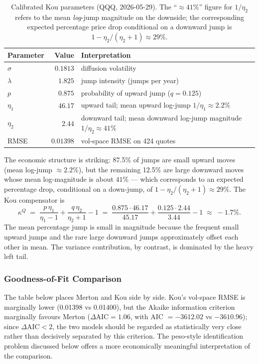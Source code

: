 \documentclass[11pt,a4paper]{article}
\begin{document}
\begin{table}[H]
\centering
\caption{Calibrated Kou parameters (QQQ, 2026-05-29). The
``$\approx 41\%$'' figure for $1/\eta_2$ refers to the mean
\emph{log}-jump magnitude on the downside; the corresponding expected
percentage price drop conditional on a downward jump is
$1 - \eta_2/(\eta_2 + 1) \approx 29\%$.}
\begin{tabular}{lrl}
\toprule
Parameter      & Value     & Interpretation \\
\midrule
$\sigma$       & $0.1813$  & diffusion volatility \\
$\lambda$      & $1.825$   & jump intensity (jumps per year) \\
$p$            & $0.875$   & probability of upward jump ($q = 0.125$) \\
$\eta_1$       & $46.17$   & upward tail; mean upward log-jump $1/\eta_1 \approx 2.2\%$ \\
$\eta_2$       & $2.44$    & downward tail; mean downward log-jump magnitude $1/\eta_2 \approx 41\%$ \\
RMSE           & $0.01398$ & vol-space RMSE on 424 quotes \\
\bottomrule
\end{tabular}
\end{table}

The economic structure is striking: 87.5\% of jumps are small upward
moves (mean log-jump $\approx 2.2\%$), but the remaining 12.5\% are
large downward moves whose mean log-magnitude is about $41\%$ --- which
corresponds to an expected percentage drop, conditional on a down-jump,
of $1 - \eta_2/(\eta_2 + 1) \approx 29\%$. The Kou compensator is
\[
   \kappa^Q \;=\; \frac{p\,\eta_1}{\eta_1 - 1}
                 + \frac{q\,\eta_2}{\eta_2 + 1} - 1
              \;=\; \frac{0.875 \cdot 46.17}{45.17}
                  + \frac{0.125 \cdot 2.44}{3.44} - 1
              \;\approx\; -1.7\%.
\]
The mean percentage jump is small in magnitude because the frequent
small upward jumps and the rare large downward jumps approximately
offset each other in mean. The variance contribution, by contrast, is
dominated by the heavy left tail.

\subsubsection*{Goodness-of-Fit Comparison}

The table below places Merton and Kou side by side. Kou's vol-space
RMSE is marginally lower (0.01398 vs 0.01400), but the Akaike
information criterion marginally favours Merton ($\Delta\text{AIC} =
1.06$, with AIC $= -3612.02$ vs $-3610.96$); since $\Delta\text{AIC} < 2$,
the two models should be regarded as statistically very close rather
than decisively separated by this criterion. The peso-style
identification problem discussed below offers a more economically
meaningful interpretation of the comparison.
\end{document}
